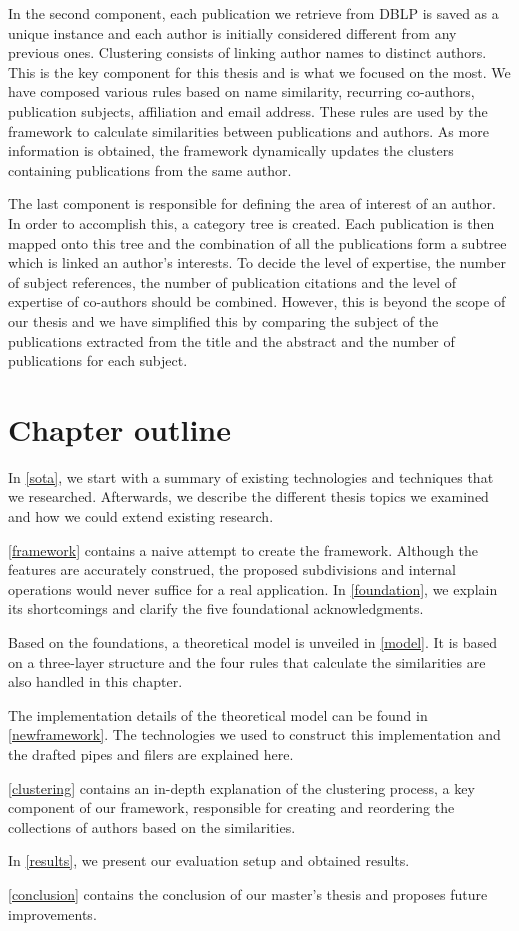 In the second component, each publication we retrieve from DBLP is saved as a unique instance and each author is initially considered different from any previous ones. Clustering consists of linking author names to distinct authors. This is the key component for this thesis and is what we focused on the most. We have composed various rules based on name similarity, recurring co-authors, publication subjects, affiliation and email address. These rules are used by the framework to calculate similarities between publications and authors. As more information is obtained, the framework dynamically updates the clusters containing publications from the same author.

The last component is responsible for defining the area of interest of an author. In order to accomplish this, a category tree is created. Each publication is then mapped onto this tree and the combination of all the publications form a subtree which is linked an author's interests. To decide the level of expertise, the number of subject references, the number of publication citations and the level of expertise of co-authors should be combined. However, this is beyond the scope of our thesis and we have simplified this by comparing the subject of the publications extracted from the title and the abstract and the number of publications for each subject.

\section{Chapter outline}

In \autoref{sota}, we start with a summary of existing technologies and techniques that we researched. Afterwards, we describe the different thesis topics we examined and how we could extend existing research. 

\autoref{framework} contains a naive attempt to create the framework. Although the features are accurately construed, the proposed subdivisions and internal operations would never suffice for a real application. In \autoref{foundation}, we explain its shortcomings and clarify the five foundational acknowledgments.

Based on the foundations, a theoretical model is unveiled in \autoref{model}. It is based on a three-layer structure and the four rules that calculate the similarities are also handled in this chapter.

The implementation details of the theoretical model can be found in \autoref{newframework}. The technologies we used to construct this implementation and the drafted pipes and filers are explained here.

\autoref{clustering} contains an in-depth explanation of the clustering process, a key component of our framework, responsible for creating and reordering the collections of authors based on the similarities.

In \autoref{results}, we present our evaluation setup and obtained results.

\autoref{conclusion} contains the conclusion of our master's thesis and proposes future improvements.